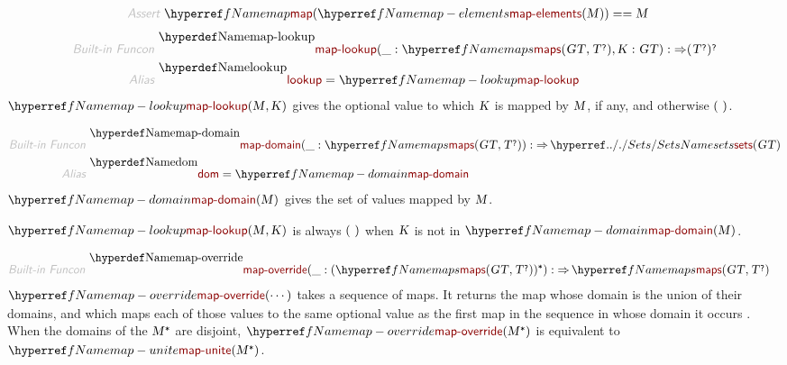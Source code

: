 \begin{align*}
  \KEY{Assert} ~ 
  & \NAMEREF{map}
      ( \NAMEREF{map-elements}
          ( \VAR{M} ) ) == 
      \VAR{M}
\end{align*}
\begin{align*}
  \KEY{Built-in Funcon} ~ 
  & \NAMEDECL{map-lookup}(\_ : \NAMEREF{maps}
                                ( \VAR{GT},   
                                  \VAR{T}\QUERY ), \VAR{K} : \VAR{GT}) :  \TO ( \VAR{T}\QUERY )\QUERY
\\
  \KEY{Alias} ~ 
  & \NAMEDECL{lookup} = \NAMEREF{map-lookup}
\end{align*}
$\SHADE{\NAMEREF{map-lookup}
           ( \VAR{M},   
             \VAR{K} )}$ gives the optional value to which $\SHADE{\VAR{K}}$ is mapped by $\SHADE{\VAR{M}}$,
  if any, and otherwise $\strut(  ~  )\strut$.

\begin{align*}
  \KEY{Built-in Funcon} ~ 
  & \NAMEDECL{map-domain}(\_ : \NAMEREF{maps}
                                ( \VAR{GT},   
                                  \VAR{T}\QUERY )) :  \TO \NAMEHYPER{../.}{Sets}{sets}
                                                                         ( \VAR{GT} )
\\
  \KEY{Alias} ~ 
  & \NAMEDECL{dom} = \NAMEREF{map-domain}
\end{align*}
$\SHADE{\NAMEREF{map-domain}
           ( \VAR{M} )}$ gives the set of values mapped by $\SHADE{\VAR{M}}$.

$\SHADE{\NAMEREF{map-lookup}
           ( \VAR{M},   
             \VAR{K} )}$ is always $\strut(  ~  )\strut$ when $\SHADE{\VAR{K}}$ is not in $\SHADE{\NAMEREF{map-domain}
           ( \VAR{M} )}$.

\begin{align*}
  \KEY{Built-in Funcon} ~ 
  & \NAMEDECL{map-override}(\_ : ( \NAMEREF{maps}
                                  ( \VAR{GT},   
                                    \VAR{T}\QUERY ) )\STAR) :  \TO \NAMEREF{maps}
                                                                         ( \VAR{GT},   
                                                                           \VAR{T}\QUERY )
\end{align*}
$\SHADE{\NAMEREF{map-override}
           ( \cdots )}$ takes a sequence of maps. It returns the map whose
  domain is the union of their domains, and which maps each of those values
  to the same optional value as the first map in the sequence in whose domain 
  it occurs
  . 
  When the domains of the $\SHADE{\VAR{M}\STAR}$ are disjoint, $\SHADE{\NAMEREF{map-override}
           ( \VAR{M}\STAR )}$ is equivalent
  to $\SHADE{\NAMEREF{map-unite}
           ( \VAR{M}\STAR )}$.

